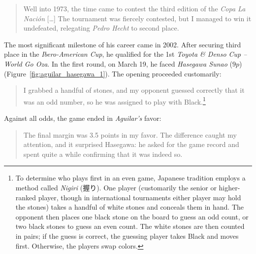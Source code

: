 \begin{quote}
	Well into 1973, the time came to contest the third edition of the \textit{Copa La Nación} [\dots] The tournament was fiercely contested, but I managed to win it undefeated, relegating \textit{Pedro Hecht} to second place.
\end{quote}
The most significant milestone of his career came in 2002. After securing third place in the \textit{Ibero-American Cup}, he qualified for the 1st \textit{Toyota \& Denso Cup -- World Go Oza}. In the first round, on March 19, he faced \textit{Hasegawa Sunao} ($9p$) (Figure~\ref{fig:aguilar_hasegawa_1}). The opening proceeded customarily:
\begin{quote}
	I grabbed a handful of stones, and my opponent guessed correctly that it was an odd number, so he was assigned to play with Black.\footnote{To determine who plays first in an even game, Japanese tradition employs a method called \textit{Nigiri} (握り). One player (customarily the senior or higher-ranked player, though in international tournaments either player may hold the stones) takes a handful of white stones and conceals them in hand. The opponent then places one black stone on the board to guess an odd count, or two black stones to guess an even count. The white stones are then counted in pairs; if the guess is correct, the	guessing player takes Black and moves first. Otherwise, the players swap colors.}
\end{quote}
Against all odds, the game ended in \textit{Aguilar's} favor:
\begin{quote}
	The final margin was 3.5 points in my favor. The difference caught my attention, and it surprised Hasegawa: he asked for the game record and spent quite a while confirming that it was indeed so.
\end{quote}

